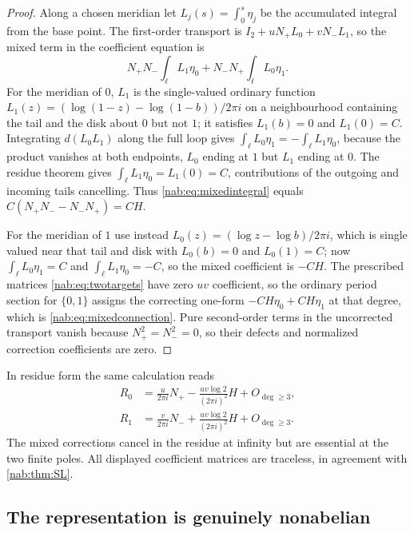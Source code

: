\documentclass[11pt,letterpaper]{article}
\theoremstyle{definition}
\theoremstyle{remark}
\numberwithin{equation}{section}
\begin{document}
\begin{proof}
Along a chosen meridian let $L_j(s)=\int_0^s\eta_j$ be the accumulated
integral from the base point. The first-order transport is
$I_2+uN_+L_0+vN_-L_1$, so the mixed term in the coefficient equation is
\begin{equation}\label{nab:eq:mixedintegral}
 N_+N_-\int_\ell L_1\eta_0+N_-N_+\int_\ell L_0\eta_1.
\end{equation}
For the meridian of $0$, $L_1$ is the single-valued ordinary function
$L_1(z)=(\log(1-z)-\log(1-b))/2\pi i$ on a neighbourhood containing the tail
and the disk about $0$ but not $1$; it satisfies $L_1(b)=0$ and $L_1(0)=C$.
Integrating $d(L_0L_1)$ along the full loop gives
$\int_\ell L_0\eta_1=-\int_\ell L_1\eta_0$, because the product vanishes at
both endpoints, $L_0$ ending at $1$ but $L_1$ ending at $0$. The residue
theorem gives $\int_\ell L_1\eta_0=L_1(0)=C$, contributions of the outgoing and
incoming tails cancelling. Thus \eqref{nab:eq:mixedintegral} equals
$C(N_+N_--N_-N_+)=CH$.

For the meridian of $1$ use instead $L_0(z)=(\log z-\log b)/2\pi i$, which is
single valued near that tail and disk with $L_0(b)=0$ and $L_0(1)=C$; now
$\int_\ell L_0\eta_1=C$ and $\int_\ell L_1\eta_0=-C$, so the mixed coefficient
is $-CH$. The prescribed matrices \eqref{nab:eq:twotargets} have zero $uv$
coefficient, so the ordinary period section for $\{0,1\}$ assigns the
correcting one-form $-CH\eta_0+CH\eta_1$ at that degree, which is
\eqref{nab:eq:mixedconnection}. Pure second-order terms in the uncorrected
transport vanish because $N_+^2=N_-^2=0$, so their defects and normalized
correction coefficients are zero.
\end{proof}

In residue form the same calculation reads
\begin{align}
 R_0&=\frac{u}{2\pi i}N_+-\frac{uv\log2}{(2\pi i)^2}H+O_{\deg\geq3},
 \label{nab:eq:R0}\\
 R_1&=\frac{v}{2\pi i}N_-+\frac{uv\log2}{(2\pi i)^2}H+O_{\deg\geq3}.
 \label{nab:eq:R1}
\end{align}
The mixed corrections cancel in the residue at infinity but are essential at
the two finite poles. All displayed coefficient matrices are traceless, in
agreement with \cref{nab:thm:SL}.

\subsection{The representation is genuinely nonabelian}
\end{document}

